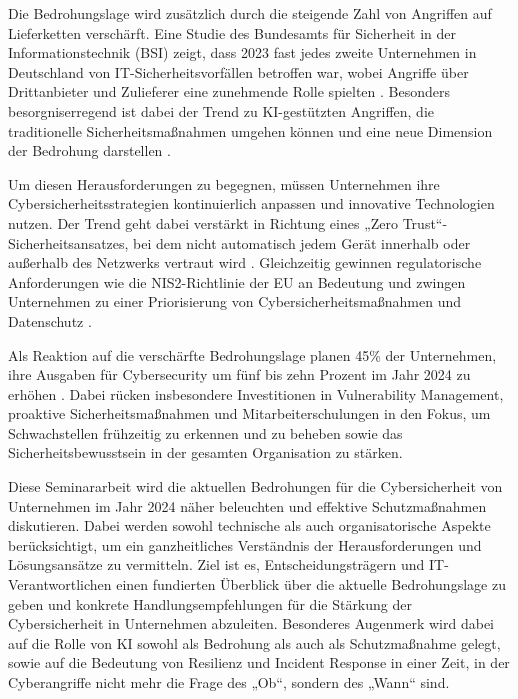 \documentclass[12pt,a4paper]{article}
\begin{document}
Die Bedrohungslage wird zusätzlich durch die steigende Zahl von Angriffen auf Lieferketten verschärft. Eine Studie des Bundesamts für Sicherheit in der Informationstechnik (BSI) zeigt, dass 2023 fast jedes zweite Unternehmen in Deutschland von IT-Sicherheitsvorfällen betroffen war, wobei Angriffe über Drittanbieter und Zulieferer eine zunehmende Rolle spielten \parencite{BSI2023}. Besonders besorgniserregend ist dabei der Trend zu KI-gestützten Angriffen, die traditionelle Sicherheitsmaßnahmen umgehen können und eine neue Dimension der Bedrohung darstellen \parencite{Europol2024}.

Um diesen Herausforderungen zu begegnen, müssen Unternehmen ihre Cybersicherheitsstrategien kontinuierlich anpassen und innovative Technologien nutzen. Der Trend geht dabei verstärkt in Richtung eines „Zero Trust“-Sicherheitsansatzes, bei dem nicht automatisch jedem Gerät innerhalb oder außerhalb des Netzwerks vertraut wird \parencite{Lallie2021}. Gleichzeitig gewinnen regulatorische Anforderungen wie die NIS2-Richtlinie der EU an Bedeutung und zwingen Unternehmen zu einer Priorisierung von Cybersicherheitsmaßnahmen und Datenschutz \parencite{EuropeanCommission2024}.

Als Reaktion auf die verschärfte Bedrohungslage planen 45\% der Unternehmen, ihre Ausgaben für Cybersecurity um fünf bis zehn Prozent im Jahr 2024 zu erhöhen \parencite{Bitkom2024}. Dabei rücken insbesondere Investitionen in Vulnerability Management, proaktive Sicherheitsmaßnahmen und Mitarbeiterschulungen in den Fokus, um Schwachstellen frühzeitig zu erkennen und zu beheben sowie das Sicherheitsbewusstsein in der gesamten Organisation zu stärken.

Diese Seminararbeit wird die aktuellen Bedrohungen für die Cybersicherheit von Unternehmen im Jahr 2024 näher beleuchten und effektive Schutzmaßnahmen diskutieren. Dabei werden sowohl technische als auch organisatorische Aspekte berücksichtigt, um ein ganzheitliches Verständnis der Herausforderungen und Lösungsansätze zu vermitteln. Ziel ist es, Entscheidungsträgern und IT-Verantwortlichen einen fundierten Überblick über die aktuelle Bedrohungslage zu geben und konkrete Handlungsempfehlungen für die Stärkung der Cybersicherheit in Unternehmen abzuleiten. Besonderes Augenmerk wird dabei auf die Rolle von KI sowohl als Bedrohung als auch als Schutzmaßnahme gelegt, sowie auf die Bedeutung von Resilienz und Incident Response in einer Zeit, in der Cyberangriffe nicht mehr die Frage des „Ob“, sondern des „Wann“ sind.

\newpage
\begingroup
{} %
\setlength{\bibitemsep}{0.5\baselineskip} %
\printbibliography[title=Literaturverzeichnis]
\endgroup
\end{document}

